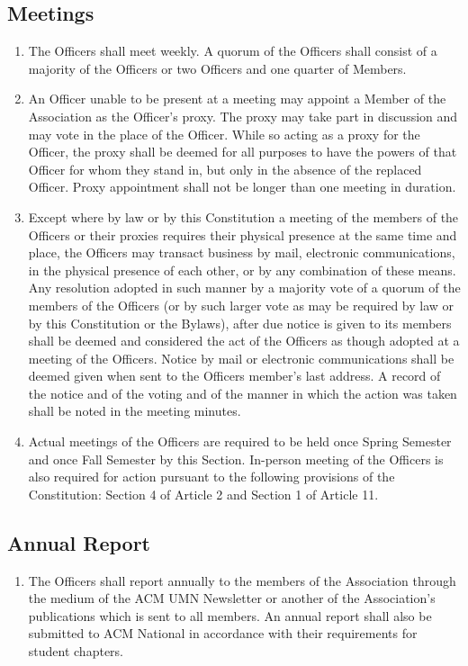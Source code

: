 \subsection{Meetings}
\begin{enumerate}
	\item The Officers shall meet weekly. A quorum of the Officers shall consist of a majority of the Officers or two Officers and one quarter of Members.
	\item An Officer unable to be present at a meeting may appoint a Member of the Association as the Officer’s proxy. The proxy may take part in discussion and may vote in the place of the Officer. While so acting as a proxy for the Officer, the proxy shall be deemed for all purposes to have the powers of that Officer for whom they stand in, but only in the absence of the replaced Officer. Proxy appointment shall not be longer than one meeting in duration.
	\item Except where by law or by this Constitution a meeting of the members of the Officers or their proxies requires their physical presence at the same time and place, the Officers may transact business by mail, electronic communications, in the physical presence of each other, or by any combination of these means. Any resolution adopted in such manner by a majority vote of a quorum of the members of the Officers (or by such larger vote as may be required by law or by this Constitution or the Bylaws), after due notice is given to its members shall be deemed and considered the act of the Officers as though adopted at a meeting of the Officers. Notice by mail or electronic communications shall be deemed given when sent to the Officers member's last address. A record of the notice and of the voting and of the manner in which the action was taken shall be noted in the meeting minutes.
	\item Actual meetings of the Officers are required to be held once Spring Semester and once Fall Semester by this Section. In-person meeting of the Officers is also required for action pursuant to the following provisions of the Constitution: Section 4 of Article 2 and Section 1 of Article 11.
\end{enumerate}

\subsection{Annual Report}
\begin{enumerate}
	\item The Officers shall report annually to the members of the Association through the medium of the ACM UMN Newsletter or another of the Association's publications which is sent to all members. An annual report shall also be submitted to ACM National in accordance with their requirements for student chapters.
\end{enumerate}

